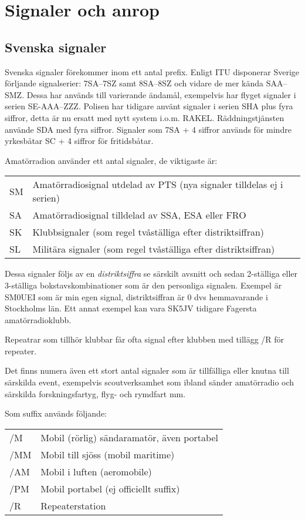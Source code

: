 \section{Signaler och anrop}
\subsection{Svenska signaler}

Svenska signaler förekommer inom ett antal prefix. Enligt ITU disponerar Sverige förljande signalserier: 7SA--7SZ samt 8SA--8SZ och vidare de mer kända SAA--SMZ. Dessa har används till varierande ändamål, exempelvis har flyget signaler i serien SE-AAA--ZZZ. Polisen har tidigare använt signaler i serien SHA plus fyra siffror, detta är nu ersatt med nytt system i.o.m. RAKEL. Räddningstjänsten använde SDA med fyra siffror. Signaler som 7SA + 4 siffror används för mindre yrkesbåtar SC + 4 siffror för fritidsbåtar.

Amatörradion använder ett antal signaler, de viktigaste är:

\begin{tabular}{ll}
	SM & Amatörradiosignal utdelad av PTS (nya signaler tilldelas ej i serien) \\
	SA & Amatörradiosignal tilldelad av SSA, ESA eller FRO                     \\
	SK & Klubbsignaler (som regel tvåställiga efter distriktsiffran)           \\
	SL & Militära signaler (som regel tvåställiga efter distriktsiffran)
\end{tabular}

Dessa signaler följs av en \textit{distriktsiffra} se särskilt avsnitt och sedan 2-ställiga eller 3-ställiga bokstavskombinationer som är den personliga signalen. Exempel är SM0UEI som är min egen signal, distriktsiffran är 0 dvs hemmavarande i Stockholms län. Ett annat exempel kan vara SK5JV tidigare Fagersta amatörradioklubb.

Repeatrar som tillhör klubbar får ofta signal efter klubben med tillägg /R för repeater.

Det finns numera även ett stort antal signaler som är tillfälliga eller knutna till särskilda event, exempelvis scoutverksamhet som ibland sänder amatörradio och särskilda forskningsfartyg, flyg- och rymdfart mm.

Som suffix används följande:

\begin{tabular}{ll}
	/M  & Mobil (rörlig) sändaramatör, även portabel \\
	/MM & Mobil till sjöss (mobil maritime)          \\
	/AM & Mobil i luften (aeromobile)                \\
	/PM & Mobil portabel (ej officiellt suffix)\\
	/R  & Repeaterstation
\end{tabular}

